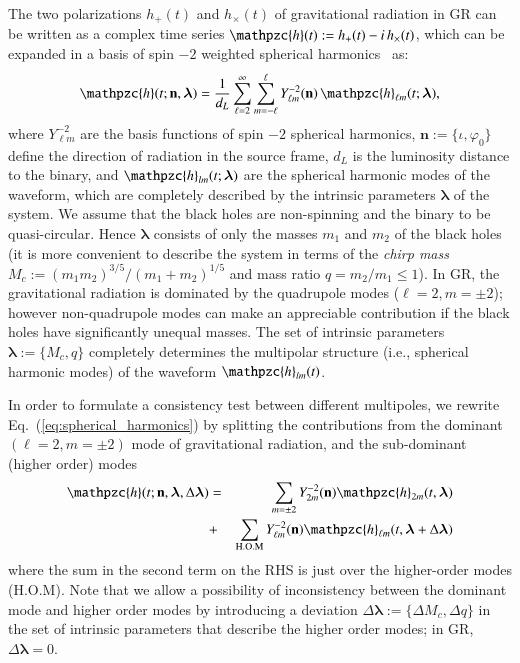 \documentclass[prl,preprintnumbers,twocolumn,eqsecnum,floatfix,a4paper,nofootinbib,superscriptaddress]{revtex4}
\newcommand{\h}{\mathpzc{h}}
\newcommand{\hlm}{\mathpzc{h}_{\ell m}}
\newcommand{\Ylm}{{Y}^{-2}_{\ell m}}
\newcommand{\blambda}{\bm{\lambda}}
\newcommand{\n}{\mathbf{n}}
\begin{document}
The two polarizations $h_+(t)$ and $h_\times(t)$ of gravitational radiation in GR can be written as a complex time series $\h(t) := h_+(t) - i \, h_\times(t)$, which can be expanded in a basis of spin $-2$ weighted spherical harmonics~\cite{NewmanPenrose} as:
\begin{equation}
\h(t; \n, \blambda) =  \frac{1}{d_L} \sum _{\ell=2}^{\infty} \sum _{m=-\ell}^{\ell} \Ylm (\n) \, {{\hlm}(t; \blambda)}, 
\label{eq:spherical_harmonics}
\end{equation}
where $\Ylm$ are the basis functions of spin $-2$ spherical harmonics, $\n := \{\iota, \varphi_0\}$ define the direction of radiation in the source frame, $d_L$ is  the luminosity distance to the binary, and ${\h}_{lm}(t; \blambda)$ are the spherical harmonic modes of the waveform, which are completely described by the intrinsic parameters $\blambda$ of the system. We assume that the black holes are non-spinning and the binary to be quasi-circular. Hence $\blambda$ consists of only the masses $m_1$ and $m_2$ of the black holes (it is more convenient to describe the system in terms of the \emph{chirp mass} $M_c := {(m_1m_2)^{3/5}}/{(m_1+m_2)^{1/5}}$ and mass ratio $q = m_2/m_1 \leq 1$). In GR, the gravitational radiation is dominated by the quadrupole modes ($\ell = 2, m = \pm 2$); however non-quadrupole modes can make an appreciable contribution if the black holes have significantly unequal masses. The set of intrinsic parameters $\blambda := \{M_c, q\}$ completely determines the multipolar structure (i.e., spherical harmonic modes) of the waveform ${\h}_{lm}(t)$. 

In order to formulate a consistency test between different multipoles, we rewrite Eq.~(\ref{eq:spherical_harmonics}) by splitting the contributions from the dominant $(\ell = 2, m = \pm 2)$ mode of gravitational radiation, and the sub-dominant (higher order) modes 
\begin{eqnarray}
\h(t; \n, \blambda, \Delta \blambda) & = & \sum_{m = \pm2} Y^{-2}_{2m} (\n) {\h}_{2m}(t, \blambda)  \nonumber \\ 
& + & \sum _{\text{H.O.M}} \Ylm (\n) \hlm(t, \blambda+\Delta \blambda)
\label{eq:test_HM}
\end{eqnarray}
where the sum in the second term on the RHS is just over the higher-order modes (H.O.M). Note that we allow a possibility of inconsistency between the dominant mode and higher order modes by introducing a deviation $\Delta \blambda := \{\Delta M_c, \Delta q\}$ in the set of intrinsic parameters that describe the higher order modes; in GR,  $\Delta \blambda = 0$. 
\end{document}
